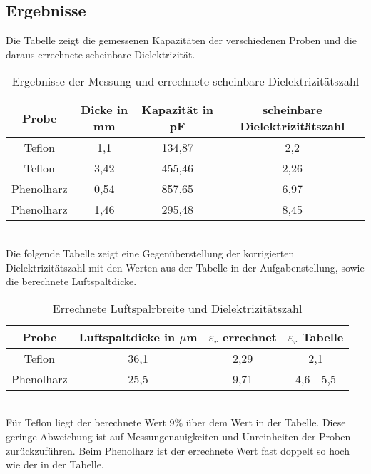 \documentclass[a4paper,twoside,12pt,DIV=13,BCOR=5mm,numbers=noenddot,cleardoublepage=empty]{scrbook}
\begin{document}
    \subsection{Ergebnisse}
    Die Tabelle zeigt die gemessenen Kapazit\"aten der verschiedenen Proben und die daraus errechnete scheinbare Dielektrizit\"at.
    \\
	\begin{table}[h]
		\begin{center}
			\begin{tabular}{|c||c|c|c|}
				\hline
				Probe & Dicke in mm & Kapazit\"at in pF & scheinbare Dielektrizit\"atszahl\\
				\hline
				\hline
				Teflon & 1,1 & 134,87 & 2,2\\
				\hline
				Teflon & 3,42 & 455,46 & 2,26\\
				\hline
				Phenolharz & 0,54 & 857,65 & 6,97\\
				\hline
				Phenolharz & 1,46 & 295,48 & 8,45\\
				\hline
			\end{tabular}
                    \caption{Ergebnisse der Messung und errechnete scheinbare Dielektrizit\"atszahl}
                    \label{tab:table4}
		\end{center}
	\end{table}
    \\
    Die folgende Tabelle zeigt eine Gegen\"uberstellung der korrigierten Dielektrizit\"atszahl mit den Werten aus der Tabelle in der Aufgabenstellung, sowie die berechnete Luftspaltdicke.
    \\
	\begin{table}[h]
		\begin{center}
			\begin{tabular}{|c||c|c|c|}
				\hline
				Probe & Luftspaltdicke in $\mu$m & $\varepsilon_{r}$ errechnet& $\varepsilon_{r}$ Tabelle\\
				\hline
				\hline
				Teflon & 36,1 & 2,29 & 2,1\\
				\hline
				Phenolharz & 25,5 & 9,71 & 4,6 - 5,5\\
				\hline
			\end{tabular}
                    \caption{Errechnete Luftspalrbreite und Dielektrizit\"atszahl}
                    \label{tab:table5}
		\end{center}
	\end{table}
    \\
    F\"ur Teflon liegt der berechnete Wert 9\% \"uber dem Wert in der Tabelle. Diese geringe Abweichung ist auf Messungenauigkeiten und Unreinheiten der Proben zur\"uckzuf\"uhren.
    Beim Phenolharz ist der errechnete Wert fast doppelt so hoch wie der in der Tabelle. 
    
\end{document}
